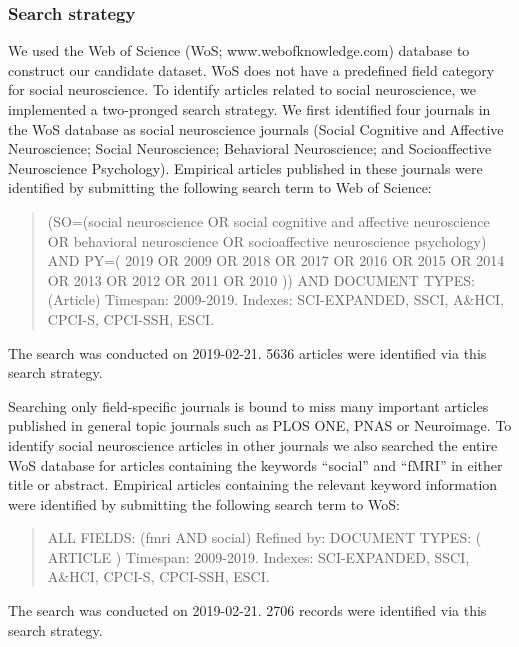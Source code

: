 \documentclass[
  man,floatsintext]{apa6}
\begin{document}
\hfill\break

\hypertarget{search-strategy}{%
\subsubsection{Search strategy}\label{search-strategy}}

We used the Web of Science (WoS; www.webofknowledge.com) database to construct our candidate dataset. WoS does not have a predefined field category for social neuroscience. To identify articles related to social neuroscience, we implemented a two-pronged search strategy. We first identified four journals in the WoS database as social neuroscience journals (Social Cognitive and Affective Neuroscience; Social Neuroscience; Behavioral Neuroscience; and Socioaffective Neuroscience Psychology). Empirical articles published in these journals were identified by submitting the following search term to Web of Science:

\begin{quote}
(SO=(social neuroscience OR social cognitive and affective neuroscience OR behavioral neuroscience OR socioaffective neuroscience psychology) AND PY=( 2019 OR 2009 OR 2018 OR 2017 OR 2016 OR 2015 OR 2014 OR 2013 OR 2012 OR 2011 OR 2010 )) AND DOCUMENT TYPES: (Article)
Timespan: 2009-2019. Indexes: SCI-EXPANDED, SSCI, A\&HCI, CPCI-S, CPCI-SSH, ESCI.
\end{quote}

The search was conducted on 2019-02-21. 5636 articles were identified via this search strategy.

Searching only field-specific journals is bound to miss many important articles published in general topic journals such as PLOS ONE, PNAS or Neuroimage. To identify social neuroscience articles in other journals we also searched the entire WoS database for articles containing the keywords ``social'' and ``fMRI'' in either title or abstract. Empirical articles containing the relevant keyword information were identified by submitting the following search term to WoS:

\begin{quote}
ALL FIELDS: (fmri AND social)
Refined by: DOCUMENT TYPES: ( ARTICLE )
Timespan: 2009-2019. Indexes: SCI-EXPANDED, SSCI, A\&HCI, CPCI-S, CPCI-SSH, ESCI.
\end{quote}

The search was conducted on 2019-02-21. 2706 records were identified via this search strategy.

\hfill\break
\end{document}
